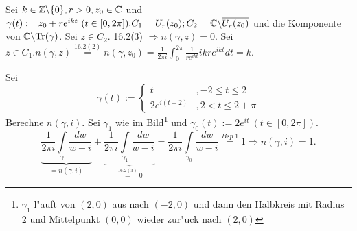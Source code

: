 \documentclass[a4paper,twoside,DIV15,BCOR12mm]{scrbook}
\def\Tr{\text{Tr}}
\def\wegint{\ensuremath{\int\limits_\gamma}}
\begin{document}
\begin{beispiele}
\item Sei $k \in \mathbb{Z} \backslash \{ 0 \}, r>0, z_0 \in \mathbb{C}$ und $\gamma(t) := z_0 + re^{ikt} \ (t \in [0,2\pi]). C_1 = U_r(z_0); C_2 = \mathbb{C} \backslash \overline{U_r(z_0)}$ und die Komponente von $\MdC \backslash \Tr(\gamma)$. Sei $z \in C_2.$ 16.2(3) $\Rightarrow n(\gamma,z)=0.$ Sei $z \in C_1. n(\gamma,z) \stackrel{16.2(2)}{=} n(\gamma,z_0) = \frac1{2\pi i} \int_0^{2\pi} \frac1{re^{ikt}}ikre^{ikt}dt = k$.
\item Sei
\[
\gamma(t) := \left\{
\begin{array}{cl}
t &, -2 \leq t \leq 2\\
2e^{i(t-2)} &, 2 < t \leq 2 + \pi
\end{array} \right.
\]
Berechne $n(\gamma,i)$. Sei $\gamma_1$ wie im Bild\footnote{$\gamma_1$ l"auft von $(2,0)$ aus nach $(-2,0)$ und dann den Halbkreis mit Radius $2$ und Mittelpunkt $(0,0)$ wieder zur"uck nach $(2,0)$}
und $\gamma_0(t) := 2e^{it} \ (t \in [0,2\pi])$.
\[
\underbrace{\frac1{2\pi i} \wegint \frac{dw}{w-i}}_{=n(\gamma,i)} + \underbrace{\frac1{2\pi i} \int\limits_{\gamma_1} \frac{dw}{w-i}}_{\stackrel{16.2(3)}{=}0} = \frac1{2\pi i} \int\limits_{\gamma_0} \frac{dw}{w-i} \stackrel{Bsp.1}{=} 1 \Rightarrow n(\gamma,i) = 1.
\]
\end{beispiele}
\end{document}
